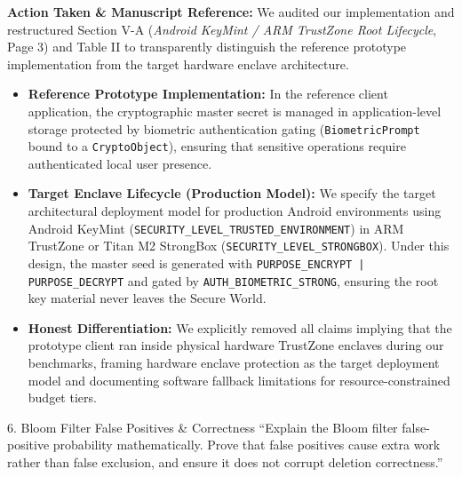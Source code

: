 \documentclass[11pt,a4paper]{article}
\begin{document}
\begin{responsebox}
\textbf{Action Taken \& Manuscript Reference:} We audited our implementation and restructured Section V-A (\emph{Android KeyMint / ARM TrustZone Root Lifecycle}, Page 3) and Table II to transparently distinguish the reference prototype implementation from the target hardware enclave architecture.

\begin{itemize}[itemsep=2pt]
    \item \textbf{Reference Prototype Implementation:} In the reference client application, the cryptographic master secret is managed in application-level storage protected by biometric authentication gating (\texttt{BiometricPrompt} bound to a \texttt{CryptoObject}), ensuring that sensitive operations require authenticated local user presence.
    \item \textbf{Target Enclave Lifecycle (Production Model):} We specify the target architectural deployment model for production Android environments using Android KeyMint (\texttt{SECURITY\_LEVEL\_TRUSTED\_ENVIRONMENT}) in ARM TrustZone or Titan M2 StrongBox (\texttt{SECURITY\_LEVEL\_STRONGBOX}). Under this design, the master seed is generated with \texttt{PURPOSE\_ENCRYPT | PURPOSE\_DECRYPT} and gated by \texttt{AUTH\_BIOMETRIC\_STRONG}, ensuring the root key material never leaves the Secure World.
    \item \textbf{Honest Differentiation:} We explicitly removed all claims implying that the prototype client ran inside physical hardware TrustZone enclaves during our benchmarks, framing hardware enclave protection as the target deployment model and documenting software fallback limitations for resource-constrained budget tiers.
\end{itemize}
\end{responsebox}

\vspace{1em}

\begin{reviewbox}{6. Bloom Filter False Positives \& Correctness}
``Explain the Bloom filter false-positive probability mathematically. Prove that false positives cause extra work rather than false exclusion, and ensure it does not corrupt deletion correctness.''
\end{reviewbox}
\end{document}
